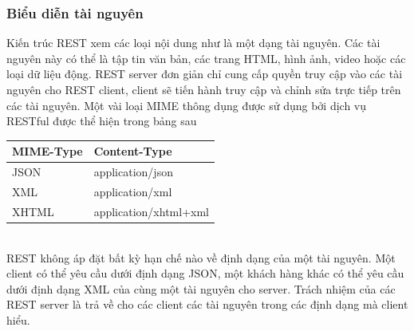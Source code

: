 \documentclass[a4paper]{article}
\begin{document}
\subsubsection{Biểu diễn tài nguyên}
Kiến trúc REST xem các loại nội dung như là một dạng tài nguyên. Các tài nguyên này có thể là tập tin văn bản, các trang HTML, hình ảnh, video hoặc các loại dữ liệu động. REST server đơn giản chỉ cung cấp quyền truy cập vào các tài nguyên cho REST client, client sẽ tiến hành truy cập và chỉnh sửa trực tiếp trên các tài nguyên. Một vài loại MIME thông dụng được sử dụng bởi dịch vụ RESTful được thể hiện trong bảng sau 
\begin{table}[h]
        \centering
            \begin{tabular}{|l|l|}
            \hline
            \textbf{MIME-Type} & \textbf{Content-Type}\\
            \hline
            JSON & application/json \\
            \hline
            XML & application/xml \\
            \hline
            XHTML & application/xhtml+xml \\
            \hline
            \end{tabular}
\end{table}  
\\
REST không áp đặt bất kỳ hạn chế nào về định dạng của một tài nguyên. Một client có thể yêu cầu dưới định dạng JSON, một khách hàng khác có thể yêu cầu dưới định dạng XML của cùng một tài nguyên cho server. Trách nhiệm của các  REST server là trả về cho các client các tài nguyên trong các định dạng mà client hiểu.
\end{document}
